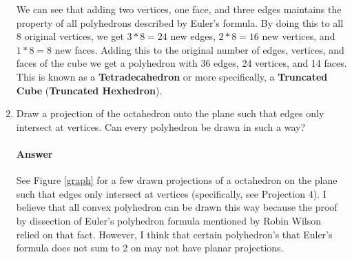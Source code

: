 \documentclass{article}
\begin{document}
\begin{enumerate}
        We can see that adding two vertices, one face, and three edges maintains the property of all polyhedrons described by Euler's formula. By doing this to all 8 original vertices, we get $3*8=24$ new edges, $2*8=16$ new vertices, and $1*8=8$
        new faces. Adding this to the original number of edges, vertices, and faces of the cube we get a polyhedron with 36 edges, 24 vertices, and 14 faces. This is known as a \textbf{Tetradecahedron} or more specifically, a \textbf{Truncated Cube} (\textbf{Truncated Hexhedron}).





    \item Draw a projection of the octahedron onto the plane such that edges only
        intersect at vertices.  Can every polyhedron be drawn in such a way?

        \paragraph{Answer}
        See Figure \ref{graph} for a few drawn projections of a octahedron on the plane such that edges only intersect at vertices (specifically, see Projection 4). I believe that all convex polyhedron can be drawn this way because the proof by dissection of Euler's polyhedron formula mentioned by Robin Wilson relied on that fact. However, I think that certain polyhedron's that Euler's formula does not sum to 2 on may not have planar projections.
        

\end{enumerate}
\end{document}
